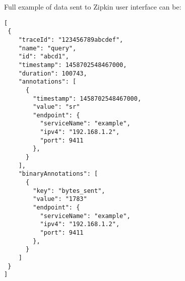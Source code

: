 Full example of data sent to Zipkin user interface can be:
\begin{lstlisting}[emph={traceId, name, id, timestamp, duration, annotations, value, endpoint, serviceName, ipv4, port, binnaryAnnotations, key},emphstyle={\textbf}]
[
 {
    "traceId": "123456789abcdef",
    "name": "query",
    "id": "abcd1",
    "timestamp": 1458702548467000,
    "duration": 100743,
    "annotations": [
      {
        "timestamp": 1458702548467000,
        "value": "sr"
        "endpoint": {
          "serviceName": "example",
          "ipv4": "192.168.1.2",
          "port": 9411
        },
      }
    ],
    "binaryAnnotations": [
      {
        "key": "bytes_sent",
        "value": "1783"
        "endpoint": {
          "serviceName": "example",
          "ipv4": "192.168.1.2",
          "port": 9411
        },
      }
    ]
 }
]
\end{lstlisting}


